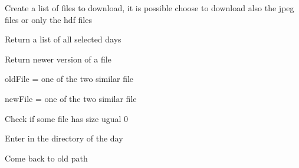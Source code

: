 \documentclass[a4paper,11pt,oneside]{sphinxmanual}
\begin{document}
\begin{fulllineitems}

\begin{fulllineitems}
\label{pymodis/pymodis:pymodis.downmodis.downModis.getFilesList}
Create a list of files to download, it is possible choose to download
also the jpeg files or only the hdf files

\end{fulllineitems}


\begin{fulllineitems}
\label{pymodis/pymodis:pymodis.downmodis.downModis.getListDays}
Return a list of all selected days

\end{fulllineitems}


\begin{fulllineitems}
\label{pymodis/pymodis:pymodis.downmodis.downModis.getNewerVersion}
Return newer version of a file

oldFile = one of the two similar file

newFile = one of the two similar file

\end{fulllineitems}


\begin{fulllineitems}
\label{pymodis/pymodis:pymodis.downmodis.downModis.removeEmptyFiles}
Check if some file has size ugual 0

\end{fulllineitems}


\begin{fulllineitems}
\label{pymodis/pymodis:pymodis.downmodis.downModis.setDirectoryIn}
Enter in the directory of the day

\end{fulllineitems}


\begin{fulllineitems}
\label{pymodis/pymodis:pymodis.downmodis.downModis.setDirectoryOver}
Come back to old path

\end{fulllineitems}


\end{fulllineitems}
\end{document}
